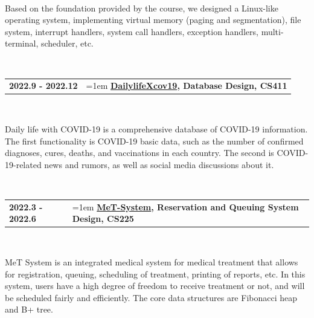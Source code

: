 \documentclass[11pt,english]{article}
\begin{document}
~\

\qquad Based on the foundation provided by the course, we designed a Linux-like operating system, implementing virtual memory (paging and segmentation), file system, interrupt handlers, system call handlers, exception handlers, multi-terminal, scheduler, etc.

~\

\begin{tabular}{p{1.5in}>{\hangindent=1em}p{5.05in}<{\raggedright}}
\textbf{2022.9 - 2022.12} & \textbf{\href{https://github.com/LancashireLiu/DailylifeXcov19}{DailylifeXcov19}, Database Design, CS411} \\
\end{tabular}

~\

\qquad Daily life with COVID-19 is a comprehensive database of COVID-19 information. The first functionality is COVID-19 basic data, such as the number of confirmed diagnoses, cures, deaths, and vaccinations in each country. The second is COVID-19-related news and rumors, as well as social media discussions about it.

~\

\begin{tabular}{p{1.5in}>{\hangindent=1em}p{5.05in}<{\raggedright}}
\textbf{2022.3 - 2022.6} & \textbf{\href{https://github.com/LancashireLiu/MeT-System}{MeT-System}, Reservation and Queuing System Design, CS225} \\
\end{tabular}

~\

\qquad MeT System is an integrated medical system for medical treatment that allows for registration, queuing, scheduling of treatment, printing of reports, etc. In this system, users have a high degree of freedom to receive treatment or not, and will be scheduled fairly and efficiently. The core data structures are Fibonacci heap and B+ tree.
\end{document}
